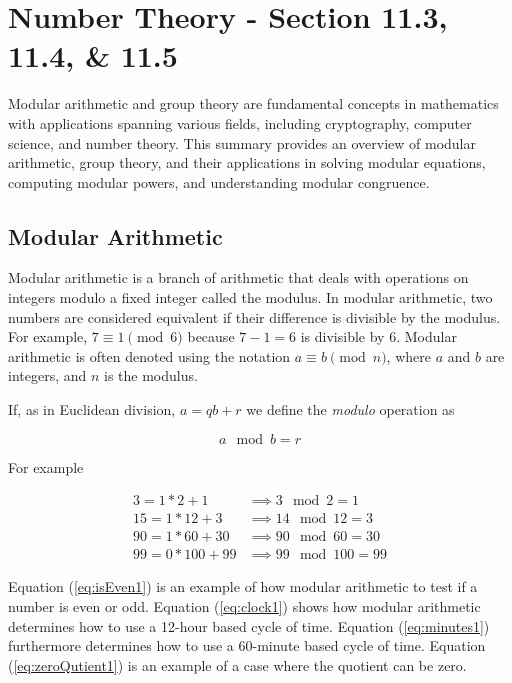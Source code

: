 \documentclass{article}
\renewcommand{\_}{\ifincsname_\else\legacyunderscore\fi}
\begin{document}
    \newpage

\section{Number Theory - Section 11.3, 11.4, \& 11.5}
Modular arithmetic and group theory are fundamental concepts in mathematics with applications spanning various fields, including cryptography, computer science, and number theory. This summary provides an overview of modular arithmetic, group theory, and their applications in solving modular equations, computing modular powers, and understanding modular congruence.
    \subsection{Modular Arithmetic}
Modular arithmetic is a branch of arithmetic that deals with operations on integers modulo a fixed integer called the modulus. In modular arithmetic, two numbers are considered equivalent if their difference is divisible by the modulus. For example, \(7 \equiv 1 \pmod{6}\) because \(7 - 1 = 6\) is divisible by 6. Modular arithmetic is often denoted using the notation \(a \equiv b \pmod{n}\), where \(a\) and \(b\) are integers, and \(n\) is the modulus.

        If, as in Euclidean division, $a = q b + r$ we define the \emph{modulo} operation as

        \begin{equation}
            a \mod b = r
        \end{equation}

        For example

        \begin{align}
            \label{eq:isEven1}      3  = 1 * 2   + 1  &\implies 3  \mod 2   = 1 \\
            \label{eq:clock1}       15 = 1 * 12  + 3  &\implies 14 \mod 12  = 3 \\
            \label{eq:minutes1}     90 = 1 * 60  + 30 &\implies 90 \mod 60  = 30 \\
            \label{eq:zeroQutient1} 99 = 0 * 100 + 99 &\implies 99 \mod 100 = 99
        \end{align}

        Equation (\ref{eq:isEven1}) is an example of how modular arithmetic to test if a number is even or odd.  Equation (\ref{eq:clock1}) shows how modular arithmetic determines how to use a 12-hour based cycle of time.  Equation (\ref{eq:minutes1}) furthermore determines how to use a 60-minute based cycle of time.  Equation (\ref{eq:zeroQutient1}) is an example of a case where the quotient can be zero.
\end{document}
